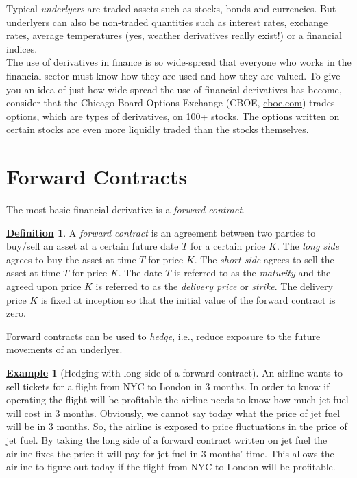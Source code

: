 \documentclass[12pt]{book}
\numberwithin{equation}{chapter}
\theoremstyle{plain}
\numberwithin{theorem}{section}
\theoremstyle{definition}
\newtheorem{definition}[theorem]{\underline{Definition}}
\newtheorem{example}[theorem]{\underline{Example}}
\numberwithin{exercise}{chapter}
\newcommand{\<}{\langle}
\renewcommand{\>}{\rangle}
\renewcommand{\(}{\left(}
\renewcommand{\)}{\right)}
\renewcommand{\[}{\left[}
\renewcommand{\]}{\right]}
\theoremstyle{definition}
\numberwithin{question}{section}
\begin{document}
\noindent
Typical \textit{underlyers} are traded assets such as stocks, bonds and currencies.  But underlyers can also be non-traded quantities such as interest rates, exchange rates, average temperatures (yes, weather derivatives really exist!) or a financial indices.
\\[0.5em]
The use of derivatives in finance is so wide-spread that everyone who works in the financial sector must know how they are used and how they are valued.  To give you an idea of just how wide-spread the use of financial derivatives has become, consider that the Chicago Board Options Exchange (CBOE, \url{cboe.com}) trades options, which are types of derivatives, on 100+ stocks.  The options written on certain stocks are even more liquidly traded than the stocks themselves.

\section{Forward Contracts}
The most basic financial derivative is a \textit{forward contract}.
\begin{definition}
A \textit{forward contract} is an agreement between two parties to buy/sell an asset at a certain future date $T$ for a certain price $K$.  The \textit{long side} agrees to buy the asset at time $T$ for price $K$.  The \textit{short side} agrees to sell the asset at time $T$ for price $K$.  The date $T$ is referred to as the \textit{maturity} and the agreed upon price $K$ is referred to as the \textit{delivery price} or \textit{strike}.
The delivery price $K$ is fixed at inception so that the initial value of the forward contract is zero.
\end{definition}
\noindent
Forward contracts can be used to \textit{hedge}, i.e., reduce exposure to the future movements of an underlyer.

\begin{example}[Hedging with long side of a forward contract]
An airline wants to sell tickets for a flight from NYC to London in 3 months.  In order to know if operating the flight will be profitable the airline needs to know how much jet fuel will cost in 3 months.  Obviously, we cannot say today what the price of jet fuel will be in 3 months.  So, the airline is exposed to price fluctuations in the price of jet fuel.  By taking the long side of a forward contract written on jet fuel the airline fixes the price it will pay for jet fuel in 3 months' time.  This allows the airline to figure out today if the flight from NYC to London will be profitable.
\end{example}
\end{document}
